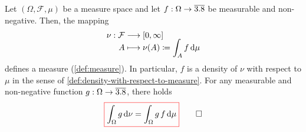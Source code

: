 \begin{theorem}\label{thm:density-defines-measure}
Let $(\Omega,\mathcal{F},\mu)$ be a measure space and let $f : \Omega \to \overline{3.8}$ be measurable and non-negative.
Then, the mapping
\[
\begin{aligned}
\nu : \mathcal{F} &\longrightarrow [0,\infty] \\
A &\longmapsto \nu(A) \coloneq \smash[t]{\int_A f\,\mathrm{d}\mu}
\end{aligned}
\]
defines a measure (\autoref{def:measure}).
In particular, $f$ is a density of $\nu$ with respect to $\mu$ in the sense of \autoref{def:density-with-respect-to-measure}.
For any measurable and non-negative function $g : \Omega \to \overline{3.8}$, there holds
\begin{equation}\label{eq:density-integral-identity}
{\color{red}\boxed{\color{black}
\int_{\Omega} g\,\mathrm{d}\nu
=
\int_{\Omega} g \, f\,\mathrm{d}\mu
}}
\qedhere
\end{equation}
\end{theorem}
